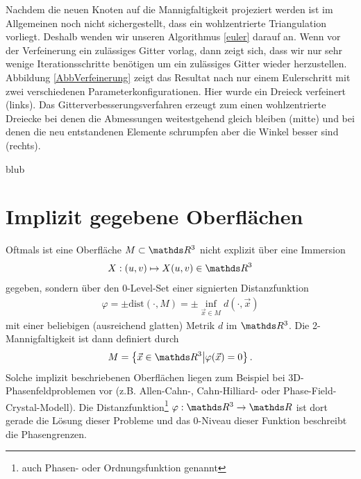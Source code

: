       Nachdem die neuen Knoten auf die Mannigfaltigkeit projeziert werden ist im Allgemeinen noch nicht sichergestellt, dass ein wohlzentrierte
      Triangulation vorliegt. Deshalb wenden wir unseren Algorithmus \eqref{euler} darauf an.
      Wenn vor der Verfeinerung ein zulässiges Gitter vorlag, dann zeigt sich, dass wir nur sehr wenige Iterationsschritte benötigen um ein
      zulässiges Gitter wieder herzustellen. Abbildung \ref{AbbVerfeinerung} zeigt das Resultat nach nur einem Eulerschritt mit zwei verschiedenen
      Parameterkonfigurationen. Hier wurde ein Dreieck verfeinert (links). Das Gitterverbesserungsverfahren erzeugt zum einen wohlzentrierte
      Dreiecke bei denen die Abmessungen weitestgehend gleich bleiben (mitte) und bei denen die neu entstandenen Elemente schrumpfen aber die Winkel
      besser sind (rechts).

     \begin{fazit}
        blub
     \end{fazit}





  \section{Implizit gegebene Oberflächen}
    \label{secImpliziteMannigfaltigkeiten}
    Oftmals ist eine Oberfläche \( M\subset\R^{3} \) nicht explizit über eine Immersion 
    \begin{align}
      X:(u,v)\mapsto X(u,v)\in\R^{3}
    \end{align}
    gegeben, sondern über den 0-Level-Set einer signierten Distanzfunktion
    \begin{align}
      \varphi = \pm\text{dist}(\cdot,M) = \pm\inf_{\vec{x}\in M} d(\cdot,\vec{x})
    \end{align}
    mit einer beliebigen (ausreichend glatten) Metrik \( d \) im \( \R^{3} \).
    Die 2-Mannigfaltigkeit ist dann definiert durch 
    \begin{align}
      M = \left\{ \vec{x}\in\R^{3} \middle| \varphi(\vec{x})=0 \right\} \text{.}
    \end{align}
    Solche implizit beschriebenen Oberflächen liegen zum Beispiel bei 3D-Phasenfeldproblemen vor 
    (z.B. Allen-Cahn-, Cahn-Hilliard- oder Phase-Field-Crystal-Modell). 
    Die Distanzfunktion\footnote{auch Phasen- oder Ordnungsfunktion genannt} \( \varphi:\R^{3}\rightarrow\R \) ist dort gerade die Lösung dieser Probleme
    und das 0-Niveau dieser Funktion beschreibt die Phasengrenzen.

